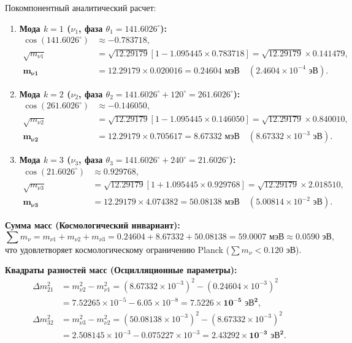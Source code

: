 \documentclass[12pt,a4paper]{article}
\begin{document}
	Покомпонентный аналитический расчет:
	\begin{enumerate}
		\item \textbf{Мода $k=1$ ($\nu_1$, фаза $\theta_1 = 141.6026^\circ$):}
		\begin{align}
			\cos(141.6026^\circ) &\approx -0.783718, \\
			\sqrt{m_{\nu 1}} &= \sqrt{12.29179} \left[ 1 - 1.095445 \times 0.783718 \right] = \sqrt{12.29179} \times 0.141479, \\
			\mathbf{m_{\nu 1}} &= 12.29179 \times 0.020016 = \mathbf{0.24604 \text{ мэВ}} \quad (2.4604 \times 10^{-4} \text{ эВ}).
		\end{align}
		\item \textbf{Мода $k=2$ ($\nu_2$, фаза $\theta_2 = 141.6026^\circ + 120^\circ = 261.6026^\circ$):}
		\begin{align}
			\cos(261.6026^\circ) &\approx -0.146050, \\
			\sqrt{m_{\nu 2}} &= \sqrt{12.29179} \left[ 1 - 1.095445 \times 0.146050 \right] = \sqrt{12.29179} \times 0.840010, \\
			\mathbf{m_{\nu 2}} &= 12.29179 \times 0.705617 = \mathbf{8.67332 \text{ мэВ}} \quad (8.67332 \times 10^{-3} \text{ эВ}).
		\end{align}
		\item \textbf{Мода $k=3$ ($\nu_3$, фаза $\theta_3 = 141.6026^\circ + 240^\circ = 21.6026^\circ$):}
		\begin{align}
			\cos(21.6026^\circ) &\approx 0.929768, \\
			\sqrt{m_{\nu 3}} &= \sqrt{12.29179} \left[ 1 + 1.095445 \times 0.929768 \right] = \sqrt{12.29179} \times 2.018510, \\
			\mathbf{m_{\nu 3}} &= 12.29179 \times 4.074382 = \mathbf{50.08138 \text{ мэВ}} \quad (5.00814 \times 10^{-2} \text{ эВ}).
		\end{align}
	\end{enumerate}
	
	\textbf{Сумма масс (Космологический инвариант):}
	\begin{equation}
		\sum m_\nu = m_{\nu 1} + m_{\nu 2} + m_{\nu 3} = 0.24604 + 8.67332 + 50.08138 = \mathbf{59.0007 \text{ мэВ}} \approx \mathbf{0.0590 \text{ эВ}},
	\end{equation}
	что удовлетворяет космологическому ограничению Planck ($\sum m_\nu < 0.120$ эВ).
	
	\textbf{Квадраты разностей масс (Осцилляционные параметры):}
	\begin{align}
		\Delta m_{21}^2 &= m_{\nu 2}^2 - m_{\nu 1}^2 = (8.67332 \times 10^{-3})^2 - (0.24604 \times 10^{-3})^2 \nonumber \\
		&= 7.52265 \times 10^{-5} - 6.05 \times 10^{-8} = \mathbf{7.5226 \times 10^{-5} \text{ эВ}^2}, \\
		\Delta m_{32}^2 &= m_{\nu 3}^2 - m_{\nu 2}^2 = (50.08138 \times 10^{-3})^2 - (8.67332 \times 10^{-3})^2 \nonumber \\
		&= 2.508145 \times 10^{-3} - 0.075227 \times 10^{-3} = \mathbf{2.43292 \times 10^{-3} \text{ эВ}^2}.
	\end{align}
	
\end{document}
